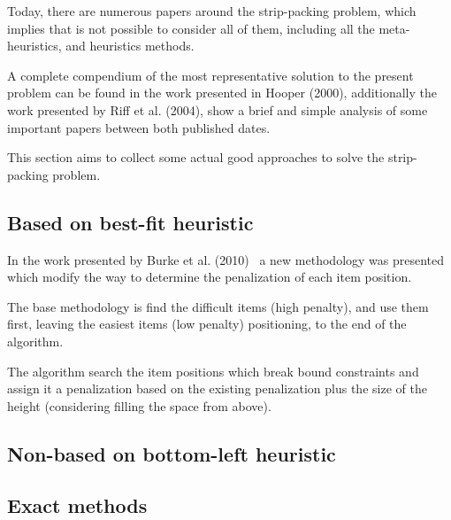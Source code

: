 Today, there are numerous papers around the
strip-packing problem, which implies that is not possible
to consider all of them, including all the meta-heuristics,
and heuristics methods.

A complete compendium of the most representative
solution to the present problem can be found in the work
presented in Hooper (2000)\cite{hooper},
additionally the work presented by Riff et al. (2004)\cite{riff},
show a brief and simple analysis of some important
papers between both published dates.

This section aims to collect some actual good approaches
to solve the strip-packing problem.


\subsection{Based on best-fit heuristic}

In the work presented by Burke et al. (2010)~\cite{burke}
a new methodology was presented which modify the
way to determine the penalization of each item position.

The base methodology is find the difficult items (high penalty),
and use them first, leaving the easiest items (low penalty)
positioning, to the end of the algorithm.

The algorithm search the item positions which break bound
constraints and assign it a penalization based on the existing
penalization plus the size of the height (considering filling the space
from above).

%
%

\subsection{Non-based on bottom-left heuristic}




\subsection{Exact methods}


